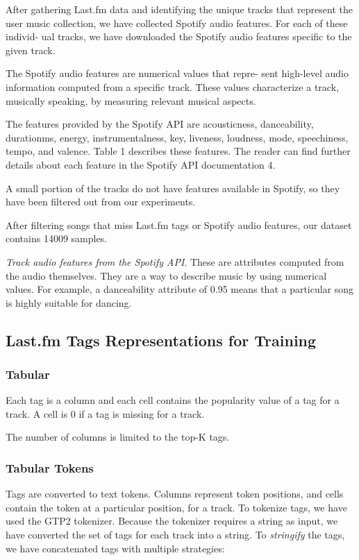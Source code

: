 \documentclass[sn-mathphys]{sn-jnl}%
\theoremstyle{thmstyleone}%
\theoremstyle{thmstyletwo}%
\theoremstyle{thmstylethree}%
\begin{document}
After gathering Last.fm data and identifying the unique
tracks that represent the user music collection, we have
collected Spotify audio features. For each of these individ-
ual tracks, we have downloaded the Spotify audio features
specific to the given track.

The Spotify audio features are numerical values that repre-
sent high-level audio information computed from a specific
track. These values characterize a track, musically speaking,
by measuring relevant musical aspects.

The features provided by the Spotify API are acousticness,
danceability, duration\textunderscore ms, energy, instrumentalness, key,
liveness, loudness, mode, speechiness, tempo, and valence.
Table 1 describes these features. The reader can find further
details about each feature in the Spotify API documentation
4.

A small portion of the tracks do not have features available in
Spotify, so they have been filtered out from our experiments.

After filtering songs that miss Last.fm tags or Spotify audio features,
our dataset contains 14009 samples.

\emph{Track audio features from the Spotify API}. These are
attributes computed from the audio themselves. They
are a way to describe music by using numerical values.
For example, a danceability attribute of 0.95 means
that a particular song is highly suitable for dancing.

\subsection{Last.fm Tags Representations for Training}


\subsubsection{Tabular}
Each tag is a column and each cell contains the popularity value of a tag for a track.
A cell is 0 if a tag is missing for a track.

The number of columns is limited to the top-K tags.

\subsubsection{Tabular Tokens}

Tags are converted to text tokens. Columns represent token positions, and cells contain the token at a particular position, for a track.
To tokenize tags, we have used the GTP2 tokenizer.
Because the tokenizer requires a string as input, we have converted the set of tags for each track into a string.
To \emph{stringify} the tags, we have concatenated tags with multiple strategies:
\end{document}
